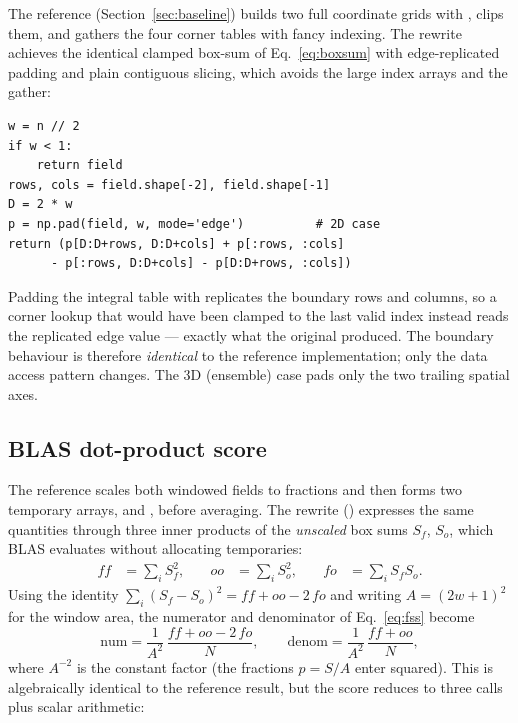 The reference  (Section~\ref{sec:baseline}) builds two
full coordinate grids with , clips them, and gathers the four
corner tables with fancy indexing. The rewrite achieves the identical clamped
box-sum of Eq.~\eqref{eq:boxsum} with edge-replicated padding and plain
contiguous slicing, which avoids the large index arrays and the gather:

{\begin{lstlisting}[style=python]
w = n // 2
if w < 1:
    return field
rows, cols = field.shape[-2], field.shape[-1]
D = 2 * w
p = np.pad(field, w, mode='edge')          # 2D case
return (p[D:D+rows, D:D+cols] + p[:rows, :cols]
      - p[:rows, D:D+cols] - p[D:D+rows, :cols])
\end{lstlisting}}

Padding the integral table with  replicates the boundary
rows and columns, so a corner lookup that would have been clamped to the last
valid index instead reads the replicated edge value --- exactly what the
original  produced. The boundary behaviour is therefore
\emph{identical} to the reference implementation; only the data access pattern
changes. The 3D (ensemble) case pads only the two trailing spatial axes.

\subsection{BLAS dot-product score}
\label{sec:score}

The reference  scales both windowed fields to fractions and then
forms two temporary arrays,  and
, before averaging. The rewrite ()
expresses the same quantities through three inner products of the
\emph{unscaled} box sums $S_f$, $S_o$, which BLAS evaluates without allocating
temporaries:
%
\begin{equation}
  \begin{aligned}
  \mathit{ff} &= \textstyle\sum_i S_f^2, &\quad
  \mathit{oo} &= \textstyle\sum_i S_o^2, &\quad
  \mathit{fo} &= \textstyle\sum_i S_f S_o .
  \end{aligned}
\end{equation}
%
Using the identity $\sum_i (S_f-S_o)^2 = \mathit{ff} + \mathit{oo} -
2\,\mathit{fo}$ and writing $A=(2w+1)^2$ for the window area, the numerator and
denominator of Eq.~\eqref{eq:fss} become
%
\begin{equation}
  \mathrm{num} = \frac{1}{A^2}\,\frac{\mathit{ff}+\mathit{oo}-2\,\mathit{fo}}{N},
  \qquad
  \mathrm{denom} = \frac{1}{A^2}\,\frac{\mathit{ff}+\mathit{oo}}{N},
\end{equation}
%
where $A^{-2}$ is the constant  factor (the fractions
$p=S/A$ enter squared). This is algebraically identical to the reference
result, but the score reduces to three  calls plus scalar
arithmetic:

